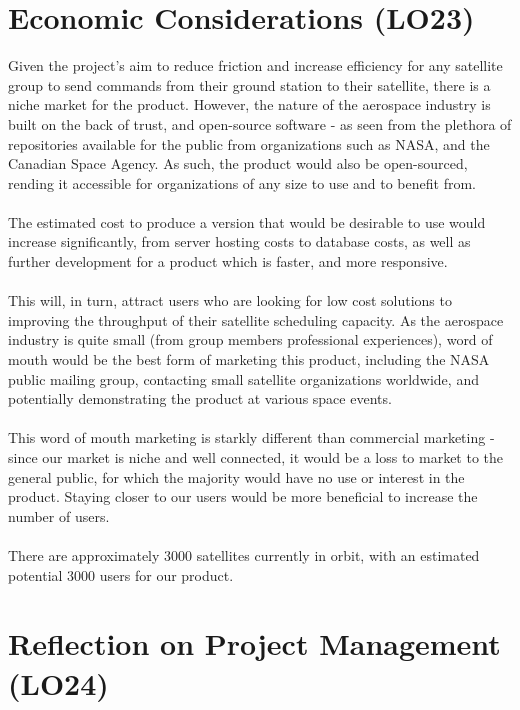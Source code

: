 \documentclass{article}
\begin{document}
\section{Economic Considerations (LO23)}

Given the project's aim to reduce friction and increase efficiency for any satellite group to send commands from their ground station to their satellite, there is a niche market for the product. However, the nature of the aerospace industry is built on the back of trust, and open-source software - as seen from the plethora of repositories available for the public from organizations such as NASA, and the Canadian Space Agency. As such, the product would also be open-sourced, rending it accessible for organizations of any size to use and to benefit from.
\\ \\
The estimated cost to produce a version that would be desirable to use would increase significantly, from server hosting costs to database costs, as well as further development for a product which is faster, and more responsive.
\\ \\
This will, in turn, attract users who are looking for low cost solutions to improving the throughput of their satellite scheduling capacity. As the aerospace industry is quite small (from group members professional experiences), word of mouth would be the best form of marketing this product, including the NASA public mailing group, contacting small satellite organizations worldwide, and potentially demonstrating the product at various space events. 
\\ \\
This word of mouth marketing is starkly different than commercial marketing - since our market is niche and well connected, it would be a loss to market to the general public, for which the majority would have no use or interest in the product. Staying closer to our users would be more beneficial to increase the number of users.
\\ \\ 
There are approximately 3000 satellites currently in orbit, with an estimated potential 3000 users for our product.


\section{Reflection on Project Management (LO24)}

\end{document}
